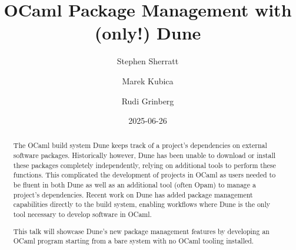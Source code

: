 \documentclass{article}
\title{\bf OCaml Package Management with (only!) Dune}
\date{2025-06-26}
\author[1]{Stephen Sherratt}
\author[1]{Marek Kubica}
\author[1]{Rudi Grinberg}
\affil[1]{Tarides}
\begin{document}
    \maketitle

    \begin{abstract}
        The OCaml build system Dune keeps track of a project's dependencies on
        external software packages. Historically however, Dune has been unable
        to download or install these packages completely independently, relying
        on additional tools to perform these functions. This complicated the
        development of projects in OCaml as users needed to be fluent in both
        Dune as well as an additional tool (often Opam) to manage a project's
        dependencies. Recent work on Dune has added package management
        capabilities directly to the build system, enabling workflows where Dune
        is the only tool necessary to develop software in OCaml.

        This talk will showcase Dune's new package management features by
        developing an OCaml program starting from a bare system with no OCaml
        tooling installed.
    \end{abstract}
\end{document}
